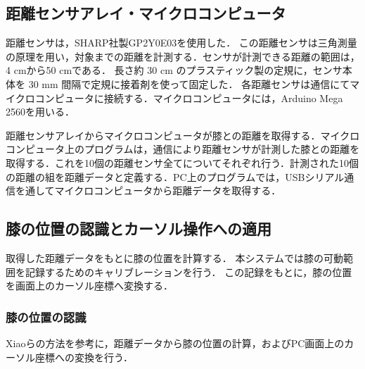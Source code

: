 \documentclass[submit, techrep]{ipsj}
\begin{document}
\subsection{距離センサアレイ・マイクロコンピュータ}
距離センサは，SHARP社製GP2Y0E03を使用した．
この距離センサは三角測量の原理を用い，対象までの距離を計測する．センサが計測できる距離の範囲は，4 \si{cm}から50 \si{cm}である．
長さ約 30 \si{cm} のプラスティック製の定規に，センサ本体を 30 \si{mm} 間隔で定規に接着剤を使って固定した．
各距離センサは\iic 通信にてマイクロコンピュータに接続する．マイクロコンピュータには，Arduino Mega 2560を用いる．\par
距離センサアレイからマイクロコンピュータが膝との距離を取得する．マイクロコンピュータ上のプログラムは，\iic 通信により距離センサが計測した膝との距離を取得する．これを10個の距離センサ全てについてそれぞれ行う．計測された10個の距離の組を距離データと定義する．PC上のプログラムでは，USBシリアル通信を通してマイクロコンピュータから距離データを取得する．


\subsection{膝の位置の認識とカーソル操作への適用}
取得した距離データをもとに膝の位置を計算する．
本システムでは膝の可動範囲を記録するためのキャリブレーションを行う．
この記録をもとに，膝の位置を画面上のカーソル座標へ変換する．
\subsubsection{膝の位置の認識}
Xiao\cite{Xiao:2018:LOP:3173574.3173669}らの方法を参考に，距離データから膝の位置の計算，およびPC画面上のカーソル座標への変換を行う．
\end{document}
